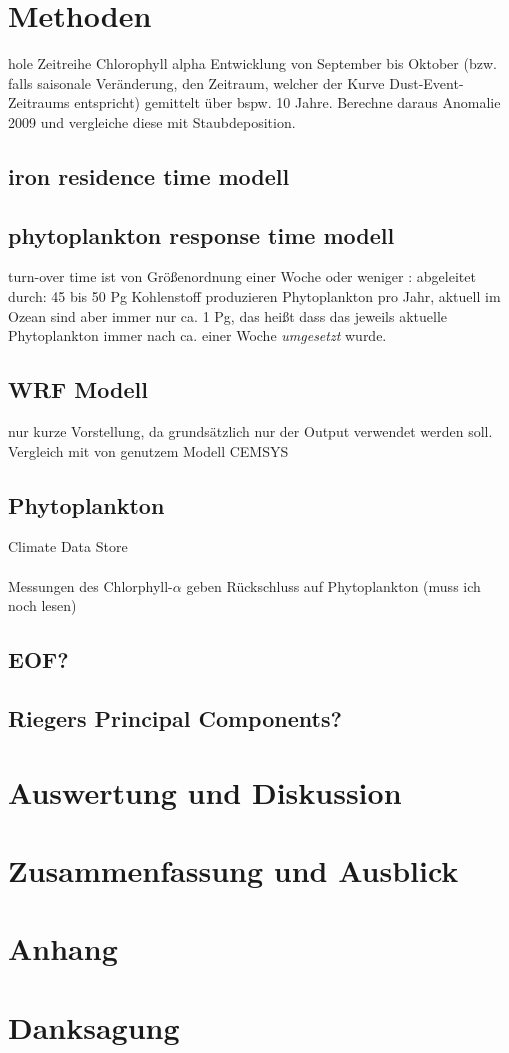 \documentclass[12pt,a4paper,onecolumn]{scrartcl}
\begin{document}
\section{Methoden}
hole Zeitreihe Chlorophyll alpha Entwicklung von September bis Oktober (bzw. falls saisonale Veränderung, den Zeitraum, welcher der Kurve Dust-Event-Zeitraums entspricht) gemittelt über bspw. 10 Jahre. Berechne daraus Anomalie 2009 und vergleiche diese mit Staubdeposition.
\subsection{iron residence time modell}
\subsection{phytoplankton response time modell}
turn-over time ist von Größenordnung einer Woche oder weniger \citep{Falkowski.1998}: abgeleitet durch: 45 bis 50 Pg Kohlenstoff produzieren Phytoplankton pro Jahr, aktuell im Ozean sind aber immer nur ca. 1 Pg, das heißt dass das jeweils aktuelle Phytoplankton immer nach ca. einer Woche \textit{umgesetzt} wurde.

\subsection{WRF Modell}
nur kurze Vorstellung, da grundsätzlich nur der Output verwendet werden soll. Vergleich mit von \cite{Gabric.2016} genutzem Modell CEMSYS
\subsection{Phytoplankton}
Climate Data Store \nocite{*}
\\\\
Messungen des Chlorphyll-$\alpha$ geben Rückschluss auf Phytoplankton \citep{RYTHER.1957}(muss ich noch lesen)

\subsection{EOF?}
\subsection{Riegers Principal Components?}

\section{Auswertung und Diskussion}
\section{Zusammenfassung und Ausblick}
\newpage
\printbibliography
\newpage
\appendix
\section{Anhang}
\listoffigures
{}
\listoftables
\section{Danksagung}
\end{document}
